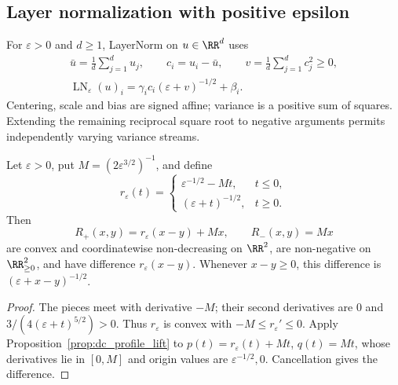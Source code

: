 \subsection{Layer normalization with positive epsilon}

For $\varepsilon>0$ and $d\ge1$, LayerNorm on $u\in\RR^d$ uses
\begin{equation}
\begin{gathered}
    \bar u=\frac1d\sum_{j=1}^d u_j,\qquad c_i=u_i-\bar u,
    \qquad v=\frac1d\sum_{j=1}^d c_j^2\ge0,\\
    \operatorname{LN}_{\varepsilon}(u)_i
    =\gamma_i c_i(\varepsilon+v)^{-1/2}+\beta_i.
\end{gathered}
    \label{eq:layernorm_dc_definition}
\end{equation}
Centering, scale and bias are signed affine; variance is a positive sum of squares. Extending the remaining reciprocal square root to negative arguments permits independently varying variance streams.

\begin{proposition}\label{prop:reciprocal_sqrt_pair}
Let $\varepsilon>0$, put $M=(2\varepsilon^{3/2})^{-1}$, and define
\begin{equation}
    r_{\varepsilon}(t)=
    \begin{cases}
        \varepsilon^{-1/2}-Mt,&t\le0,\\
        (\varepsilon+t)^{-1/2},&t\ge0.
    \end{cases}
    \label{eq:reciprocal_sqrt_extension}
\end{equation}
Then
\begin{equation}
    R_+(x,y)=r_{\varepsilon}(x-y)+Mx,
    \qquad R_-(x,y)=Mx
    \label{eq:reciprocal_sqrt_pair}
\end{equation}
are convex and coordinatewise non-decreasing on $\RR^2$, are non-negative on $\RR^2_{\ge0}$, and have difference $r_{\varepsilon}(x-y)$. Whenever $x-y\ge0$, this difference is $(\varepsilon+x-y)^{-1/2}$.
\end{proposition}

\begin{proof}
The pieces meet with derivative $-M$; their second derivatives are $0$ and $3/(4(\varepsilon+t)^{5/2})>0$. Thus $r_\varepsilon$ is convex with $-M\le r_\varepsilon'\le0$. Apply Proposition~\ref{prop:dc_profile_lift} to $p(t)=r_\varepsilon(t)+Mt$, $q(t)=Mt$, whose derivatives lie in $[0,M]$ and origin values are $\varepsilon^{-1/2},0$. Cancellation gives the difference.
\end{proof}

